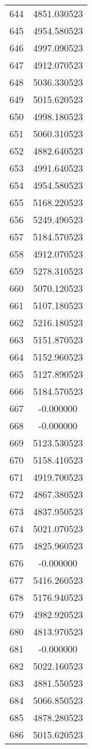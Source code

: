 \documentclass[12pt]{article}
\begin{document}
\begin{longtable}{@{}cc@{}}
644 & 4851.030523 \\
645 & 4954.580523 \\
646 & 4997.090523 \\
647 & 4912.070523 \\
648 & 5036.330523 \\
649 & 5015.620523 \\
650 & 4998.180523 \\
651 & 5060.310523 \\
652 & 4882.640523 \\
653 & 4991.640523 \\
654 & 4954.580523 \\
655 & 5168.220523 \\
656 & 5249.490523 \\
657 & 5184.570523 \\
658 & 4912.070523 \\
659 & 5278.310523 \\
660 & 5070.120523 \\
661 & 5107.180523 \\
662 & 5216.180523 \\
663 & 5151.870523 \\
664 & 5152.960523 \\
665 & 5127.890523 \\
666 & 5184.570523 \\
667 & -0.000000 \\
668 & -0.000000 \\
669 & 5123.530523 \\
670 & 5158.410523 \\
671 & 4919.700523 \\
672 & 4867.380523 \\
673 & 4837.950523 \\
674 & 5021.070523 \\
675 & 4825.960523 \\
676 & -0.000000 \\
677 & 5416.260523 \\
678 & 5176.940523 \\
679 & 4982.920523 \\
680 & 4813.970523 \\
681 & -0.000000 \\
682 & 5022.160523 \\
683 & 4881.550523 \\
684 & 5066.850523 \\
685 & 4878.280523 \\
686 & 5015.620523 \\

\end{longtable}
\end{document}
